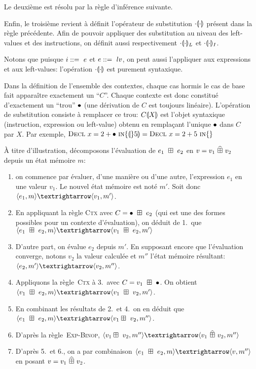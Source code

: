 Le deuxième est résolu par la règle d'inférence suivante.

\begin{mathpar}
\end{mathpar}

Enfin, le troisième revient à définit l'opérateur de substitution
$\phxx{\ctxSub}$ présent dans la règle précédente. Afin de pouvoir appliquer des
substitution au niveau des left-values et des instructions, on définit aussi
respectivement $\phxx{\ctxSubL}$ et $\phxx{\ctxSubI}$.

Notons que puisque $i \gramisa e$ et $e \gramisa lv$, on peut aussi l'appliquer
aux expressions et aux left-values: l'opération $\phxx\ctxSub$ est purement
syntaxique.

Dans la définition de l'ensemble des contextes, chaque cas hormis le cas de base
fait apparaître exactement un ``$C$''. Chaque contexte est donc constitué
d'exactement un ``trou'' $\ctxEmpty$ (une dérivation de $C$ est toujours
linéaire). L'opération de substitution consiste à remplacer ce trou:
$\ctxSub{C}{X}$ est l'objet syntaxique (instruction, expression ou left-value)
obtenu en remplaçant l'unique $\ctxEmpty$ dans $C$ par $X$. Par exemple,
$\ctxSub{\iDecl{x}{2+\ctxEmpty}}{5} = \iDecl{x}{2+5}$

À titre d'illustration, décomposons l'évaluation de $e_1~\opbin~e_2$ en $v =
v_1~\widehat{\opbin}~v_2$ depuis un état mémoire $m$:

\begin{enumerate}
\item
  on commence par évaluer, d'une manière ou d'une autre, l'expression
  $e_1$ en une valeur $v_1$. Le nouvel état mémoire est noté $m'$. Soit
  donc $\mm{m}{e_1}{m'}{v_1}$.
\item
  En appliquant la règle \textsc{Ctx} avec $C = \ctxOp{\ctxEmpty}{e_2}$ (qui est
  une des formes possibles pour un contexte d'évaluation), on déduit de 1.\ que
  $\mm{m}{e_1~\opbin~e_2}{m'}{v_1~\opbin~e_2}$
\item
  D'autre part, on évalue $e_2$ depuis $m'$. En supposant encore que
  l'évaluation converge, notons $v_2$ la valeur calculée et $m''$ l'état mémoire
  résultant: $\mm{m'}{e_2}{m''}{v_2}$.
\item
  Appliquons la règle~\textsc{Ctx} à 3.\ avec $C = \ctxOp{v_1}{\ctxEmpty}$. On
  obtient $\mm{m}{v_1~\opbin~e_2}{m'}{v_1~\opbin~v_2}$.
\item
  En combinant les résultats de 2.\ et 4.\ on en déduit que
  $\mm{m}{e_1~\opbin~e_2}{m''}{v_1\opbin~v_2}$.
\item D'après la règle~\textsc{Exp-Binop},
  $ \mm{m''}{v_1\opbin~v_2}{m''}{v_1~\widehat{\opbin}~v_2}$
\item D'après 5.\ et 6., on a par combinaison
  $\mm{m}{e_1~\opbin~e_2}{m''}{v}$
  en posant
  $v = v_1~\widehat{\opbin}~v_2$.
\end{enumerate}

